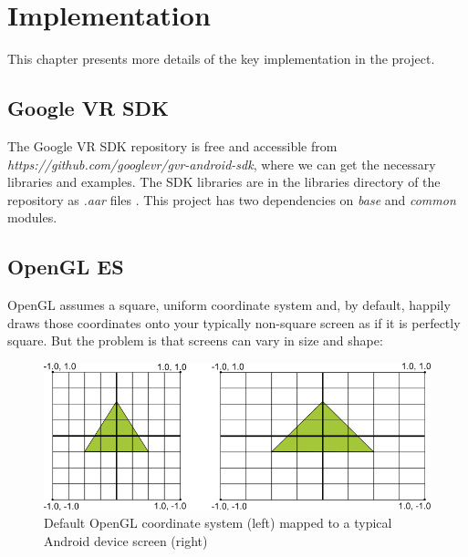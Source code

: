 \label{chapter-implementation}
\chapter{Implementation}

This chapter presents more details of the key implementation in the project.

\section{Google VR SDK}

The Google VR SDK repository is free and accessible from \emph{https://github.com/googlevr/gvr-android-sdk}, where we can get the necessary libraries and examples. The SDK libraries are in the libraries directory of the repository as \emph{.aar} files \cite{google.aar-format.2016}. This project has two dependencies on \emph{base} and \emph{common} modules.

\section{OpenGL ES}

OpenGL assumes a square, uniform coordinate system and, by default, happily draws those coordinates onto your typically non-square screen as if it is perfectly square. But the problem is that screens can vary in size and shape:

\begin{figure}[H]
\caption{Default OpenGL coordinate system (left) mapped to a typical Android device screen (right) \cite{google.opengles.2016}}
\label{fig:opengl-coordinates}
\centering
\includegraphics[width=\linewidth]{Figures/opengl-coordinates.png}
\decoRule
\end{figure}

